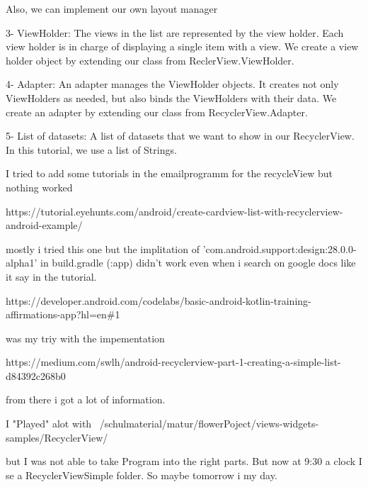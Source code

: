 Also, we can implement our own layout manager

3- ViewHolder: The views in the list are represented by the view holder. Each view holder is in charge of displaying a single item with a view. We create a view holder object by extending our class from ReclerView.ViewHolder.

4- Adapter: An adapter manages the ViewHolder objects. It creates not only ViewHolders as needed, but also binds the ViewHolders with their data. We create an adapter by extending our class from RecyclerView.Adapter.

5- List of datasets: A list of datasets that we want to show in our RecyclerView. In this tutorial, we use a list of Strings.

I tried to add some tutorials in the emailprogramm for the recycleView but nothing worked

https://tutorial.eyehunts.com/android/create-cardview-list-with-recyclerview-android-example/

mostly i tried this one but the implitation of 'com.android.support:design:28.0.0-alpha1' in build.gradle (:app) didn't work even when i search on google docs like it say in the tutorial.

https://developer.android.com/codelabs/basic-android-kotlin-training-affirmations-app?hl=en\#1

was my triy with the impementation

https://medium.com/swlh/android-recyclerview-part-1-creating-a-simple-list-d84392c268b0

from there i got a lot of information. 

I "Played" alot with ~/schulmaterial/matur/flowerPoject/views-widgets-samples/RecyclerView/

but I was not able to take Program into the right parts. But now at 9:30 a clock I se a RecyclerViewSimple folder. So maybe tomorrow i my day. 













